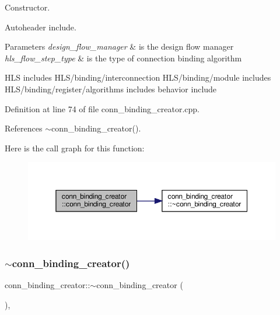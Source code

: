 Constructor. 

Autoheader include.


\begin{DoxyParams}{Parameters}
{\em design\+\_\+flow\+\_\+manager} & is the design flow manager \\
\hline
{\em hls\+\_\+flow\+\_\+step\+\_\+type} & is the type of connection binding algorithm\\
\hline
\end{DoxyParams}
H\+LS includes H\+L\+S/binding/interconnection H\+L\+S/binding/module includes H\+L\+S/binding/register/algorithms includes behavior include 

Definition at line 74 of file conn\+\_\+binding\+\_\+creator.\+cpp.



References $\sim$conn\+\_\+binding\+\_\+creator().

Here is the call graph for this function\+:
\nopagebreak
\begin{figure}[H]
\begin{center}
\leavevmode
\includegraphics[width=350pt]{dc/d1b/classconn__binding__creator_a09179684d2f2d0c46a0dc248321cfdaf_cgraph}
\end{center}
\end{figure}
\mbox{\label{classconn__binding__creator_afb5c0a1ec11cfa1523842efbbe44aa4e}} 
\subsubsection{\texorpdfstring{$\sim$conn\+\_\+binding\+\_\+creator()}{~conn\_binding\_creator()}}
{\footnotesize\ttfamily conn\+\_\+binding\+\_\+creator\+::$\sim$conn\+\_\+binding\+\_\+creator (\begin{DoxyParamCaption}{ }\end{DoxyParamCaption})\hspace{0.3cm}{\ttfamily [override]}, {\ttfamily [default]}}



